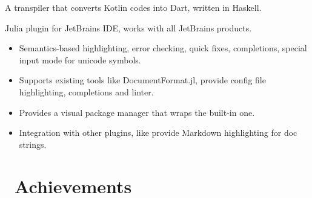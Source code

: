 \documentclass{resume}
\begin{document}
A transpiler that converts Kotlin codes into Dart, written in Haskell.

Julia plugin for JetBrains IDE, works with all JetBrains products.
\begin{itemize}
  \item Semantics-based highlighting, error checking, quick fixes, completions, special input mode for unicode symbols.
  \item Supports existing tools like DocumentFormat.jl, provide config file highlighting, completions and linter.
  \item Provides a visual package manager that wraps the built-in one.
  \item Integration with other plugins, like provide Markdown highlighting for doc strings.
\end{itemize}


\section{\faHeartO\ Achievements}
\end{document}
